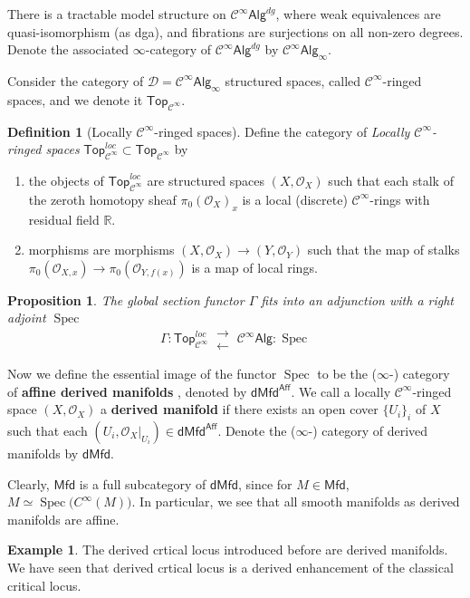\documentclass[11pt]{amsart}
\numberwithin{equation}{section}
\newtheorem{prop}[thm]{Proposition}
\theoremstyle{definition}
\newtheorem{example}[thm]{Example}
\newtheorem{defn}[thm]{Definition}
\theoremstyle{remark}
\numberwithin{equation}{section}
\newcommand{\CO}{{\mathcal O}}
\newcommand{\cinf}{{\mathcal C}^{\infty}}
\newcommand{\R}{{\mathbb{R}}}
\newcommand{\aff}{\mathsf{Aff}}
\newcommand{\mfd}{\mathsf{Mfd}}
\newcommand{\dmfd}{\mathsf{dMfd}}
\newcommand{\alg}{\mathsf{Alg}}
\newcommand{\Top}{\mathsf{Top}}
\newcommand{\spec}{\operatorname{Spec}}
\begin{document}
There is a tractable model structure on $\cinf\alg^{dg}$, where weak equivalences are quasi-isomorphism (as dga), and fibrations are surjections on all non-zero degrees. Denote the associated $\infty$-category of $\cinf\alg^{dg}$ by $\cinf\alg_{\infty}$.

Consider the category of $\mathscr{D}=\cinf\alg_{\infty}$ structured spaces, called $\cinf$-ringed spaces, and we denote it $\Top_{\cinf}$. 


\begin{defn}[Locally $\cinf$-ringed spaces]
	Define the category of {\it Locally $\cinf$-ringed spaces} $\Top_{\cinf}^{loc} \subset \Top_{\cinf}$ by
	\begin{enumerate}
		\item the objects of $\Top_{\cinf}^{loc}$ are structured spaces $(X,\CO_X)$ such that each stalk of the zeroth homotopy sheaf $\pi_0(\CO_X)_x$ is a local (discrete) $\cinf$-rings with residual field $\R$.
		\item  morphisms are morphisms $(X, \CO_X) \to (Y, \CO_Y)$ such that the map of stalks $\pi_0(\CO_{X,x})\to \pi_0 (\CO_{Y,f(x)})$ is a map of local rings. 
	\end{enumerate}
\end{defn}

\begin{prop}
	The global section functor $\Gamma$ fits into an adjunction with a right adjoint $\spec$ \begin{equation*}
	\Gamma: \Top_{\cinf}^{loc}\  \substack{\longrightarrow\\[-1em]  \longleftarrow}\   \cinf\alg :\spec
	\end{equation*}
\end{prop}

Now we define the essential image of the functor $\spec$ to be the ($\infty$-) category of {\bf affine derived manifolds }, denoted by $\dmfd^{\aff}$. We call a locally $\cinf$-ringed space $(X,\CO_X)$ a {\bf derived manifold} if there exists an open cover $\{U_i\}_i$ of $X$ such that each $(U_i, \CO_X|_{U_i})\in \dmfd^{\aff}$. Denote the ($\infty$-) category of derived manifolds by $\dmfd$.

Clearly, $\mfd$ is a full subcategory of $\dmfd$, since for $M\in\mfd$, $M\simeq \spec\big(C^{\infty}(M) \big)$. In particular, we see that all smooth manifolds as derived manifolds are affine. 

\begin{example}
	The derived crtical locus introduced before are derived manifolds. We have seen that derived crtical locus is a derived enhancement of the classical critical locus. 
\end{example} 
\end{document}
